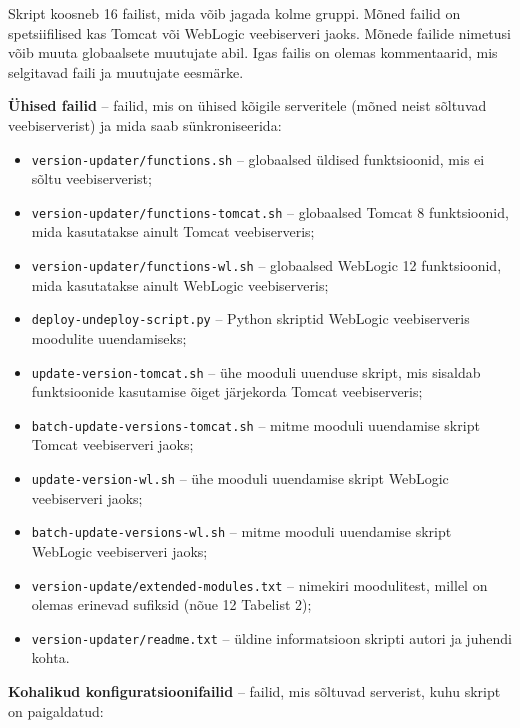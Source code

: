 \documentclass[12pt]{article}
\newcommand{\code}[1]{\texttt{#1}}
\begin{document}
  \newpage
  
  Skript koosneb 16 failist, mida võib jagada kolme gruppi. Mõned failid on spetsiifilised kas Tomcat või WebLogic veebiserveri jaoks. Mõnede failide nimetusi võib muuta globaalsete muutujate abil. Igas failis on olemas kommentaarid, mis selgitavad faili ja muutujate eesmärke.

  \textbf{Ühised failid} \--- failid, mis on ühised kõigile serveritele (mõned neist sõltuvad veebiserverist) ja mida saab sünkroniseerida:
  
  \begin{itemize}
    \item \code{version-updater/functions.sh} \--- globaalsed üldised funktsioonid, mis ei sõltu veebiserverist;
    \item \code{version-updater/functions-tomcat.sh} \--- globaalsed Tomcat 8 funktsioonid, mida kasutatakse ainult Tomcat veebiserveris;
    \item \code{version-updater/functions-wl.sh} \--- globaalsed WebLogic 12 funktsioonid, mida kasutatakse ainult WebLogic veebiserveris;
    \item \code{deploy-undeploy-script.py} \--- Python skriptid WebLogic veebiserveris moodulite uuendamiseks;
    \item \code{update-version-tomcat.sh} \--- ühe mooduli uuenduse skript, mis sisaldab funktsioonide kasutamise õiget järjekorda Tomcat veebiserveris;
    \item \code{batch-update-versions-tomcat.sh} \--- mitme mooduli uuendamise skript Tomcat veebiserveri jaoks;
    \item \code{update-version-wl.sh} \--- ühe mooduli uuendamise skript WebLogic veebiserveri jaoks;
    \item \code{batch-update-versions-wl.sh} \--- mitme mooduli uuendamise skript WebLogic veebiserveri jaoks;
    \item \code{version-update/extended-modules.txt} \--- nimekiri moodulitest, millel on olemas erinevad sufiksid (nõue 12 Tabelist 2);
    \item \code{version-updater/readme.txt} \--- üldine informatsioon skripti autori ja juhendi kohta.
  \end{itemize}
  
  \textbf{Kohalikud konfiguratsioonifailid} \--- failid, mis sõltuvad serverist, kuhu skript on paigaldatud:
  
\end{document}
